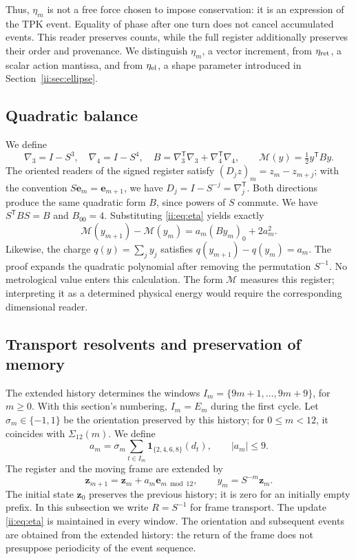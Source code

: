 Thus, $\eta_m$ is not a free force chosen to impose conservation: it is an expression of the TPK event. Equality of phase after one turn does not cancel accumulated events. This reader preserves counts, while the full register additionally preserves their order and provenance. We distinguish $\eta_m$, a vector increment, from $\eta_{\rm ret}$, a scalar action mantissa, and from $\eta_{\rm el}$, a shape parameter introduced in Section~\ref{ii:sec:ellipse}.

\subsection{Quadratic balance}
We define
\[
\nabla_3=I-S^3,\quad \nabla_4=I-S^4,\quad
B=\nabla_3^{\mathsf T}\nabla_3+\nabla_4^{\mathsf T}\nabla_4,\qquad
\mathcal M(y)=\tfrac12 y^{\mathsf T}By.
\]
The oriented readers of the signed register satisfy $(D_jz)_m=z_m-z_{m+j}$; with the convention $S\mathbf e_m=\mathbf e_{m+1}$, we have $D_j=I-S^{-j}=\nabla_j^{\mathsf T}$. Both directions produce the same quadratic form $B$, since powers of $S$ commute. We have $S^{\mathsf T}BS=B$ and $B_{00}=4$. Substituting \eqref{ii:eq:eta} yields exactly
\begin{equation}
\mathcal M(y_{m+1})-\mathcal M(y_m)
=a_m(By_m)_0+2a_m^2.
\label{ii:ii:mem:balance}
\end{equation}
Likewise, the charge $q(y)=\sum_jy_j$ satisfies $q(y_{m+1})-q(y_m)=a_m$. The proof expands the quadratic polynomial after removing the permutation $S^{-1}$. No metrological value enters this calculation. The form $\mathcal M$ measures this register; interpreting it as a determined physical energy would require the corresponding dimensional reader.


\subsection{Transport resolvents and preservation of memory}
\label{ii:subsec:ii-memoria-resolvente}

The extended history determines the windows \(I_m=\{9m+1,\ldots,9m+9\}\), for \(m\geq0\). With this section's numbering, \(I_m=E_m\) during the first cycle. Let \(\sigma_m\in\{-1,1\}\) be the orientation preserved by this history; for \(0\leq m<12\), it coincides with \(\Sigma_{12}(m)\). We define
\[
 a_m=\sigma_m\sum_{t\in I_m}\mathbf1_{\{2,4,6,8\}}(d_t),
 \qquad |a_m|\leq9.
\]
The register and the moving frame are extended by
\[
 \mathbf z_{m+1}=\mathbf z_m+a_m\mathbf e_{m\bmod12},\qquad y_m=S^{-m}\mathbf z_m.
\]
The initial state \(\mathbf z_0\) preserves the previous history; it is zero for an initially empty prefix. In this subsection we write \(R=S^{-1}\) for frame transport. The update \eqref{ii:eq:eta} is maintained in every window. The orientation and subsequent events are obtained from the extended history: the return of the frame does not presuppose periodicity of the event sequence.


